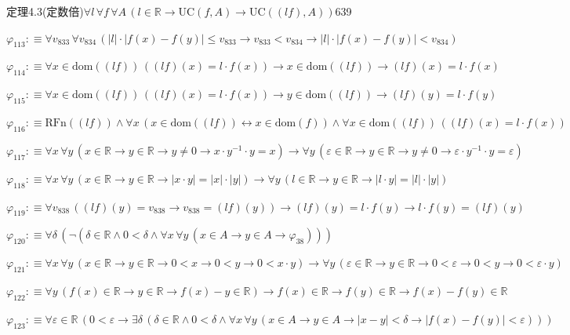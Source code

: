 \begin{fullproof}{定理4.3(定数倍)}{$\forall l\,\forall f\,\forall A\,(l \in \mathbb{R} \to \mathrm{UC}(f,A) \to \mathrm{UC}((l f),A))$}{639}
\begin{abbrevlist}
\item $\varphi_{113} :\equiv \forall v_{833}\,\forall v_{834}\,(\lvert l \rvert \cdot \lvert f(x) - f(y) \rvert \leq v_{833} \to v_{833} < v_{834} \to \lvert l \rvert \cdot \lvert f(x) - f(y) \rvert < v_{834})$
\item $\varphi_{114} :\equiv \forall x \in \mathrm{dom}((l f))\,((l f)(x) = l \cdot f(x)) \to x \in \mathrm{dom}((l f)) \to (l f)(x) = l \cdot f(x)$
\item $\varphi_{115} :\equiv \forall x \in \mathrm{dom}((l f))\,((l f)(x) = l \cdot f(x)) \to y \in \mathrm{dom}((l f)) \to (l f)(y) = l \cdot f(y)$
\item $\varphi_{116} :\equiv \mathrm{RFn}((l f)) \land \forall x\,(x \in \mathrm{dom}((l f)) \leftrightarrow x \in \mathrm{dom}(f)) \land \forall x \in \mathrm{dom}((l f))\,((l f)(x) = l \cdot f(x))$
\item $\varphi_{117} :\equiv \forall x\,\forall y\,(x \in \mathbb{R} \to y \in \mathbb{R} \to y \neq 0 \to x \cdot y^{-1} \cdot y = x) \to \forall y\,(\varepsilon \in \mathbb{R} \to y \in \mathbb{R} \to y \neq 0 \to \varepsilon \cdot y^{-1} \cdot y = \varepsilon)$
\item $\varphi_{118} :\equiv \forall x\,\forall y\,(x \in \mathbb{R} \to y \in \mathbb{R} \to \lvert x \cdot y \rvert = \lvert x \rvert \cdot \lvert y \rvert) \to \forall y\,(l \in \mathbb{R} \to y \in \mathbb{R} \to \lvert l \cdot y \rvert = \lvert l \rvert \cdot \lvert y \rvert)$
\item $\varphi_{119} :\equiv \forall v_{838}\,((l f)(y) = v_{838} \to v_{838} = (l f)(y)) \to (l f)(y) = l \cdot f(y) \to l \cdot f(y) = (l f)(y)$
\item $\varphi_{120} :\equiv \forall \delta\,(\neg (\delta \in \mathbb{R} \land 0 < \delta \land \forall x\,\forall y\,(x \in A \to y \in A \to \varphi_{38})))$
\item $\varphi_{121} :\equiv \forall x\,\forall y\,(x \in \mathbb{R} \to y \in \mathbb{R} \to 0 < x \to 0 < y \to 0 < x \cdot y) \to \forall y\,(\varepsilon \in \mathbb{R} \to y \in \mathbb{R} \to 0 < \varepsilon \to 0 < y \to 0 < \varepsilon \cdot y)$
\item $\varphi_{122} :\equiv \forall y\,(f(x) \in \mathbb{R} \to y \in \mathbb{R} \to f(x) - y \in \mathbb{R}) \to f(x) \in \mathbb{R} \to f(y) \in \mathbb{R} \to f(x) - f(y) \in \mathbb{R}$
\item $\varphi_{123} :\equiv \forall \varepsilon \in \mathbb{R}\,(0 < \varepsilon \to \exists \delta\,(\delta \in \mathbb{R} \land 0 < \delta \land \forall x\,\forall y\,(x \in A \to y \in A \to \lvert x - y \rvert < \delta \to \lvert f(x) - f(y) \rvert < \varepsilon)))$

\end{abbrevlist}
\end{fullproof}
